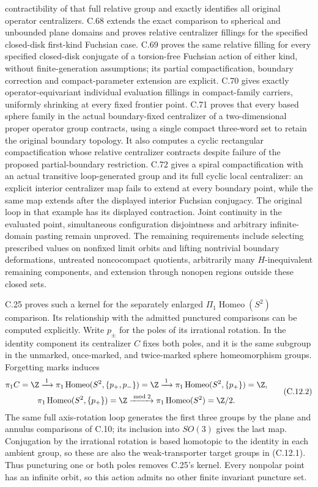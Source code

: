 contractibility of that full relative group and exactly identifies all original operator centralizers. C.68 extends the exact comparison to spherical and unbounded plane domains and proves relative centralizer fillings for the specified closed-disk first-kind Fuchsian case. C.69 proves the same relative filling for every specified closed-disk conjugate of a torsion-free Fuchsian action of either kind, without finite-generation assumptions; its partial compactification, boundary correction and compact-parameter extension are explicit. C.70 gives exactly operator-equivariant individual evaluation fillings in compact-family carriers, uniformly shrinking at every fixed frontier point. C.71 proves that every based sphere family in the actual boundary-fixed centralizer of a two-dimensional proper operator group contracts, using a single compact three-word set to retain the original boundary topology. It also computes a cyclic rectangular compactification whose relative centralizer contracts despite failure of the proposed partial-boundary restriction. C.72 gives a spiral compactification with an actual transitive loop-generated group and its full cyclic local centralizer: an explicit interior centralizer map fails to extend at every boundary point, while the same map extends after the displayed interior Fuchsian conjugacy. The original loop in that example has its displayed contraction. Joint continuity in the evaluated point, simultaneous configuration disjointness and arbitrary infinite-domain pasting remain unproved. The remaining requirements include selecting prescribed values on nonfixed limit orbits and lifting nontrivial boundary deformations, untreated noncocompact quotients,
arbitrarily many $H$-inequivalent remaining components, and
extension through nonopen regions outside these closed sets.

C.25 proves such a kernel for the separately enlarged
$\Pi_1\operatorname{Homeo}(S^2)$ comparison. Its relationship with the
admitted punctured comparisons can be computed explicitly. Write
$p_\pm$ for the poles of its irrational rotation. In the identity
component its centralizer $C$ fixes both poles, and it is the same
subgroup in the unmarked, once-marked, and twice-marked sphere
homeomorphism groups. Forgetting marks induces
\[
\begin{gathered}
 \pi_1C=\Z
 \xrightarrow{\;1\;}\pi_1\operatorname{Homeo}(S^2,\{p_+,p_-\})=\Z
 \xrightarrow{\;1\;}\pi_1\operatorname{Homeo}(S^2,\{p_+\})=\Z,\\
 \pi_1\operatorname{Homeo}(S^2,\{p_+\})=\Z
 \xrightarrow{\bmod 2}\pi_1\operatorname{Homeo}(S^2)=\Z/2.
\end{gathered}                                           \tag{C.12.2}
\]
The same full axis-rotation loop generates the first three groups by
the plane and annulus comparisons of C.10; its inclusion into $SO(3)$
gives the last map. Conjugation by the irrational rotation is based
homotopic to the identity in each ambient group, so these are also the
weak-transporter target groups in (C.12.1). Thus puncturing one or both
poles removes C.25's kernel. Every nonpolar point has an infinite orbit,
so this action admits no other finite invariant puncture set.

